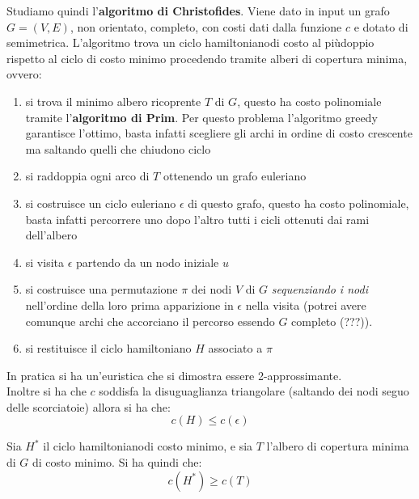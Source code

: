 																      	Studiamo quindi l'\textbf{algoritmo di Christofides}. Viene dato in input un
																      	grafo $G=(V,E)$, non orientato, completo, con costi dati dalla funzione $c$ e
																      	dotato di semimetrica. 
																      	L'algoritmo trova un ciclo hamiltonianodi costo al piùdoppio rispetto al ciclo
																      	di costo minimo procedendo tramite alberi di copertura minima, ovvero:
																      	\begin{enumerate}
																      		\item si trova il minimo albero ricoprente $T$ di $G$, questo ha costo
																      		      polinomiale tramite l'\textbf{algoritmo di Prim}. Per questo problema
																      		      l’algoritmo greedy garantisce l’ottimo, basta infatti scegliere gli archi in
																      		      ordine di costo crescente ma saltando quelli che chiudono ciclo
																      		\item si raddoppia ogni arco di $T$ ottenendo un grafo euleriano
																      		\item si costruisce un ciclo euleriano $\epsilon$ di questo grafo, questo ha
																      		      costo polinomiale, basta infatti percorrere uno dopo l’altro tutti i cicli
																      		      ottenuti dai rami dell’albero 
																      		\item si visita $\epsilon$ partendo da un nodo iniziale $u$
																      		\item si costruisce una permutazione $\pi$ dei nodi $V$ di $G$
																      		      \textit{sequenziando i nodi} nell’ordine della loro prima apparizione in
																      		      $\epsilon$ nella visita (potrei avere comunque archi che accorciano il
																      		      percorso essendo $G$ completo (???)). 
																      		\item si restituisce il ciclo hamiltoniano $H$ associato a $\pi$
																      	\end{enumerate}
																      	In pratica si ha un'euristica che si dimostra essere 2-approssimante.\\
																      	Inoltre si ha che $c$ soddisfa la disuguaglianza triangolare (saltando dei nodi
																      	seguo delle scorciatoie) allora si ha che:
																      	\[c(H)\leq c(\epsilon)\]
																      	\begin{teorema}
																      		Sia $H^*$ il ciclo hamiltonianodi costo minimo, e sia $T$ l'albero di
																      		copertura minima di $G$ di costo minimo. Si ha quindi che:
																      		\[c(H^*)\geq c(T)\]
																      	\end{teorema}
